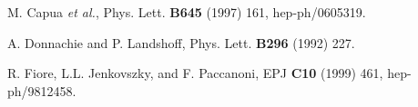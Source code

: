 \documentclass[12pt]{article}
\begin{document}
\begin{thebibliography}{99}
 M. Capua {\it et al.}, Phys. Lett. {\bf B645} (1997) 161, hep-ph/0605319.



 A. Donnachie and P. Landshoff, Phys. Lett. {\bf B296} (1992) 227.

 R. Fiore, L.L. Jenkovszky, and F. Paccanoni, EPJ {\bf C10} (1999) 461, hep-ph/9812458.




\end{thebibliography}
\end{document}
